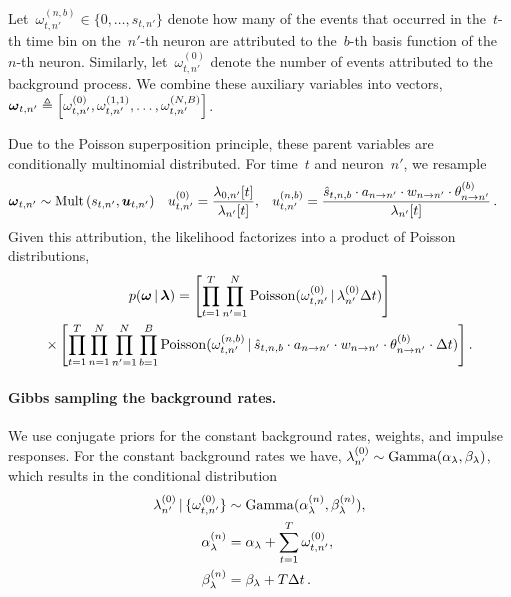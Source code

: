 Let~${\omega_{t,n'}^{(n,b)} \in \{0,\ldots, s_{t,n'}\}}$ denote how
many of the events that occurred in the~$t$-th time bin on the~$n'$-th
neuron are attributed to the~$b$-th basis function of the~$n$-th
neuron.  Similarly, let~${\omega_{t,n'}^{(0)}}$ denote the number of
events attributed to the background process. We combine these
auxiliary variables into vectors,~${\boldsymbol{\omega}_{t,n'}\triangleq
  \left[\omega_{t,n'}^{(0)}, \omega_{t,n'}^{(1,1)}, \ldots,
    \omega_{t,n'}^{(N,B)} \right]}$.

Due to the Poisson superposition principle, these parent variables are
conditionally multinomial distributed.  For time~$t$ and neuron~$n'$,
we resample
\begin{align*}
\boldsymbol{\omega}_{t,n'} &\sim \mathrm{Mult} \left(s_{t,n'}, \boldsymbol{u}_{t,n'} \right) & 
u_{t,n'}^{(0)} &= \frac{\lambda_{0,n'}[t]}{\lambda_{n'}[t]}, &
u_{t,n'}^{(n,b)} &= \frac{\hat{s}_{t,n,b} \cdot a_{n \to n'} \cdot w_{n \to n'} \cdot \theta_{n \to n'}^{(b)}}{\lambda_{n'}[t]}\, .
\end{align*}
Given this attribution, the likelihood factorizes into a product of
Poisson distributions,
\begin{multline*}
  p(\boldsymbol{\omega} \,|\, \boldsymbol{\lambda}) =
  \left[\prod_{t=1}^T \prod_{n'=1}^N \mathrm{Poisson}(\omega_{t,n'}^{(0)} \,|\, \lambda_{n'}^{(0)} \Delta t)\right]  \\
  \times
  \left[ \prod_{t=1}^T \prod_{n=1}^N \prod_{n'=1}^N \prod_{b=1}^B
    \mathrm{Poisson}(\omega_{t,n'}^{(n,b)} \,|\,
    \hat{s}_{t,n,b} \cdot a_{n \to n'} \cdot w_{n \to n'} \cdot \theta_{n\to n'}^{(b)} \cdot \Delta t)\right].
\end{multline*}

\paragraph{Gibbs sampling the background rates.}
We use conjugate priors for the constant background rates, weights,
and impulse responses.  For the constant background rates we have,
${\lambda_{n'}^{(0)} \sim\mathrm{Gamma}(\alpha_\lambda, \beta_\lambda)}$,
which results in the conditional distribution
\begin{align*}
\lambda_{n'}^{(0)} \,|\, \{\omega_{t,n'}^{(0)}\} &\sim
\mathrm{Gamma}(\alpha_\lambda^{(n)}, \beta_\lambda^{(n)}), \\
\alpha_\lambda^{(n)} &= \alpha_\lambda + \sum_{t=1}^T \omega_{t,n'}^{(0)}, \\
\beta_\lambda^{(n)} &= \beta_\lambda + T \Delta t\,.
\end{align*}

